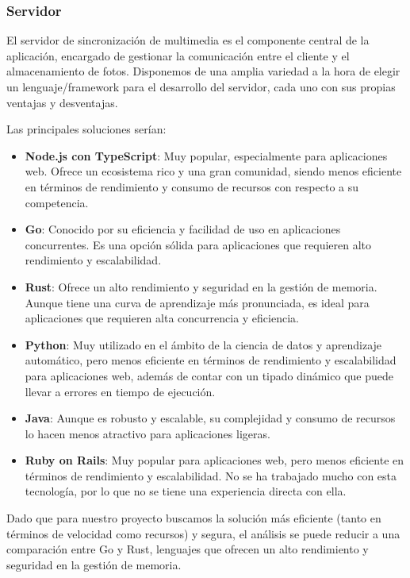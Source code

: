 \subsubsection{Servidor}
El servidor de sincronización de multimedia es el componente central de la aplicación, encargado de gestionar la comunicación entre el cliente y el almacenamiento de fotos.
Disponemos de una amplia variedad a la hora de elegir un lenguaje/framework para el desarrollo del servidor, cada uno con sus propias ventajas y desventajas.

Las principales soluciones serían:
\begin{itemize}
    \item \textbf{Node.js con TypeScript}: Muy popular, especialmente para aplicaciones web. Ofrece un ecosistema rico y una gran comunidad, siendo menos eficiente en términos de rendimiento y consumo de recursos con respecto a su competencia.
    \item \textbf{Go}: Conocido por su eficiencia y facilidad de uso en aplicaciones concurrentes. Es una opción sólida para aplicaciones que requieren alto rendimiento y escalabilidad.
    \item \textbf{Rust}: Ofrece un alto rendimiento y seguridad en la gestión de memoria. Aunque tiene una curva de aprendizaje más pronunciada, es ideal para aplicaciones que requieren alta concurrencia y eficiencia.
    \item \textbf{Python}: Muy utilizado en el ámbito de la ciencia de datos y aprendizaje automático, pero menos eficiente en términos de rendimiento y escalabilidad para aplicaciones web, además de contar con un tipado dinámico que puede llevar a errores en tiempo de ejecución.
    \item \textbf{Java}: Aunque es robusto y escalable, su complejidad y consumo de recursos lo hacen menos atractivo para aplicaciones ligeras.
    \item \textbf{Ruby on Rails}: Muy popular para aplicaciones web, pero menos eficiente en términos de rendimiento y escalabilidad. No se ha trabajado mucho con esta tecnología, por lo que no se tiene una experiencia directa con ella.
\end{itemize}

Dado que para nuestro proyecto buscamos la solución más eficiente (tanto en términos de velocidad como recursos) y segura, el análisis se puede reducir a una comparación entre Go y Rust, lenguajes que ofrecen un alto rendimiento y seguridad en la gestión de memoria.

